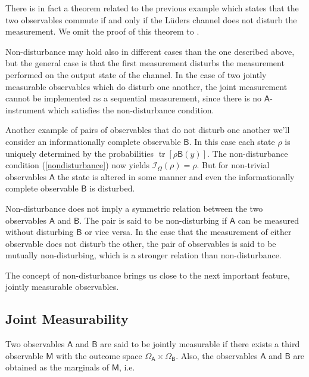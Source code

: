 \documentclass[a4paper,12pt]{wihuri}
\theoremstyle{definition}
\numberwithin{definition}{section}
\numberwithin{example}{section}
\numberwithin{theorem}{section}
\numberwithin{proposition}{section}
\numberwithin{lemma}{section}
\newcommand{\I}{\mathcal{I}}%
\newcommand{\A}{\mathsf{A}}%
\newcommand{\B}{\mathsf{B}}%
\newcommand{\M}{\mathsf{M}}%
\DeclareMathOperator{\tr}{tr}
\begin{document}
There is in fact a theorem related to the previous example which states that the two observables commute if and only if the Lüders channel does not disturb the measurement. We omit the proof of this theorem to \cite{luders}.

Non-disturbance may hold also in different cases than the one described above, but the general case is that the first measurement disturbs the measurement performed on the output state of the channel. In the case of two jointly measurable observables which do disturb one another, the joint measurement cannot be implemented as a sequential measurement, since there is no $\A$-instrument which satisfies the non-disturbance condition\cite{heinosaari_wolf_nondisturbance}.

Another example of pairs of observables that do not disturb one another we'll consider an informationally complete observable $\B$. In this case each state $\rho$ is uniquely determined by the probabilities $\tr[\rho\B(y)]$. The non-disturbance condition (\ref{nondisturbance}) now yields $\I_{\Omega}(\rho) = \rho$. But for non-trivial observables $\A$ the state is altered in some manner and even the informationally complete observable $\B$ is disturbed.

Non-disturbance does not imply a symmetric relation between the two observables $\A$ and $\B$. The pair is said to be non-disturbing if $\A$ can be measured without disturbing $\B$ or vice versa. In the case that the measurement of either observable does not disturb the other, the pair of observables is said to be mutually non-disturbing, which is a stronger relation than non-disturbance\cite{heinosaari_simultaneous}.

The concept of non-disturbance brings us close to the next important feature, jointly measurable observables.


\subsection{Joint Measurability}
Two observables $\A$ and $\B$ are said to be jointly measurable if there exists a third observable  $\M$ with the outcome space $\Omega_{\A} \times \Omega_{\B}$. Also, the observables $\A$ and $\B$ are obtained as the marginals of $\M$, i.e.
\end{document}
